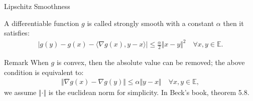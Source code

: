 \documentclass[11pt]{beamer}
\begin{document}
        \begin{frame}{Lipschitz Smoothness}
            \begin{definition}\label{def:strong_smoothness}
                A differentiable function $g$ is called strongly smooth with a constant $\alpha$ then it satisfies: 
                \begin{align}
                    |g(y) - g(x) - 
                    \langle \nabla g(x), y - x
                    \rangle| \le \frac{\alpha}{2}\Vert x - y\Vert^2
                    \quad \forall x, y\in \mathbb E. 
                \end{align}    
            \end{definition}
            \begin{block}{Remark}
                When $g$ is convex, then the absolute value can be removed; the above condition is equivalent to: 
                \begin{align*}
                   \Vert \nabla g(x) - \nabla g(y)\Vert \le \alpha\Vert y - x \Vert\quad 
                   \forall x, y \in \mathbb E,
                \end{align*}
                we assume $\Vert \cdot\Vert$ is the euclidean norm for simplicity. In Beck's book, theorem 5.8\cite{book:first_order_opt}. 
            \end{block}
        \end{frame}
\end{document}
